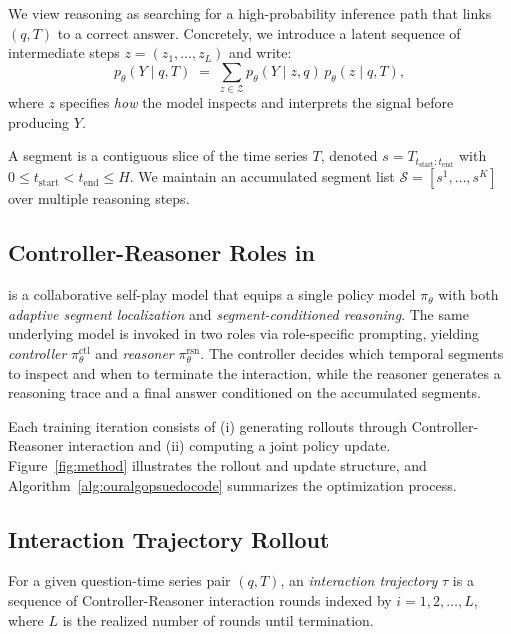 We view reasoning as searching for a high-probability inference path that links $(q,T)$ to a correct answer.
Concretely, we introduce a latent sequence of intermediate steps $z=(z_1,\dots,z_L)$ and write:
\begin{equation}
p_\theta(Y \mid q,T)
\;=\;
\sum_{z \in \mathcal{Z}}
p_\theta(Y \mid z, q)\, p_\theta(z \mid q,T),
\label{eq:ts_reasoning_latent}
\end{equation}
where $z$ specifies \emph{how} the model inspects and interprets the signal before producing $Y$.


A segment is a contiguous slice of the time series $T$, denoted
$s = T_{t_{\text{start}}:t_{\text{end}}}$ with $0 \le t_{\text{start}} < t_{\text{end}} \le H$.
We maintain an accumulated segment list $\mathcal{S}=[s^1,\dots,s^K]$ over multiple reasoning steps.



\subsection{Controller-Reasoner Roles in \algoname}
\label{sec:overview}

\algoname is a collaborative self-play model that equips a single policy model $\pi_\theta$ with both \emph{adaptive segment localization} and \emph{segment-conditioned reasoning}.
The same underlying model is invoked in two roles via role-specific prompting, yielding \emph{controller} $\pi_\theta^{\text{ctl}}$ and \emph{reasoner} $\pi_\theta^{\text{rsn}}$.
The controller decides which temporal segments to inspect and when to terminate the interaction, while the reasoner generates a reasoning trace and a final answer conditioned on the accumulated segments.

Each training iteration consists of (i) generating rollouts through Controller-Reasoner interaction and (ii) computing a joint policy update. Figure~\ref{fig:method} illustrates the rollout and update structure, and Algorithm~\ref{alg:ouralgopsuedocode} summarizes the optimization process.

\subsection{Interaction Trajectory Rollout}
\label{sec:interactionrollout}


For a given question-time series pair $(q, T)$, an \emph{interaction trajectory} $\tau$ is a sequence of Controller-Reasoner interaction rounds indexed by $i=1,2,\dots,L$, where $L$ is the realized number of rounds until termination.

